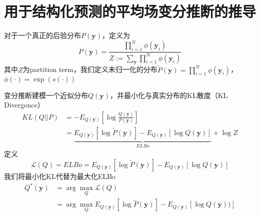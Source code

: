 \chapter{用于结构化预测的平均场变分推断的推导}
\label{appendix:mfvi-derivation}
对于一个真正的后验分布$P(\boldsymbol{y})$，定义为
\begin{equation}\label{eq:posterior}
    P(\boldsymbol{y}) =\frac{\prod_{i=1}^{N} \phi(\boldsymbol{y}_i)}{Z:=\sum_{\boldsymbol{y}}\prod_{i=1}^{N} \phi(\boldsymbol{y}_i)}
\end{equation}
其中$Z$为partition term，我们定义未归一化的分布$\tilde{P}(\boldsymbol{y})=\prod_{i=1}^{N} \phi(\boldsymbol{y}_i)$，$\phi(\cdot)=\exp(s(\cdot))$

变分推断建模一个近似分布$Q(\boldsymbol{y})$，并最小化与真实分布的KL散度（KL Divergence）
\begin{equation}
    \begin{split}
        KL(Q||P)
        &=-E_{Q(\boldsymbol{y})}\left[\log\frac{Q(\boldsymbol{y})}{P(\boldsymbol{y})}\right]\\
        &=\underbrace{E_{Q(\boldsymbol{y})}\left[\log \tilde{P}(\boldsymbol{y})\right]-E_{Q(\boldsymbol{y})}\left[\log Q(\boldsymbol{y})\right]}_{ELBo}+\log Z
    \end{split}
\end{equation}
定义
\begin{equation}
    \mathcal{L}(Q)=ELBo=E_{Q(\boldsymbol{y})}\left[\log \tilde{P}(\boldsymbol{y})\right]-E_{Q(\boldsymbol{y})}\left[\log Q(\boldsymbol{y})\right]
\end{equation}
我们将最小化KL代替为最大化ELBo
\begin{equation}
    \begin{split}
        Q^{\ast}(\boldsymbol{y}) &= \arg\max_{Q}\mathcal{L}(Q)\\
        &= \arg\max_{Q}E_{Q(\boldsymbol{y})}\left[\log \tilde{P}(\boldsymbol{y})\right]-E_{Q(\boldsymbol{y})}\left[\log Q(\boldsymbol{y}))\right]
    \end{split}
\end{equation}


